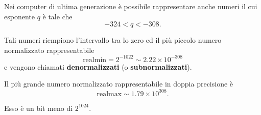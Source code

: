 \documentclass[a4paper,12pt]{article}
\theoremstyle{plain}
\theoremstyle{definition}
\theoremstyle{remark}
\begin{document}
Nei computer di ultima generazione è possibile rappresentare anche numeri il cui esponente $q$ è tale che
\[
-324 < q < -308.
\]

Tali numeri riempiono l’intervallo tra lo zero ed il più piccolo numero normalizzato rappresentabile
\[
\text{realmin} = 2^{-1022} \sim 2.22 \times 10^{-308}
\]
e vengono chiamati \textbf{denormalizzati} (o \textbf{subnormalizzati}).



Il più grande numero normalizzato rappresentabile in doppia precisione è
\[
\text{realmax} \sim 1.79 \times 10^{308}.
\]

Esso è un bit meno di $2^{1024}$.
\end{document}
